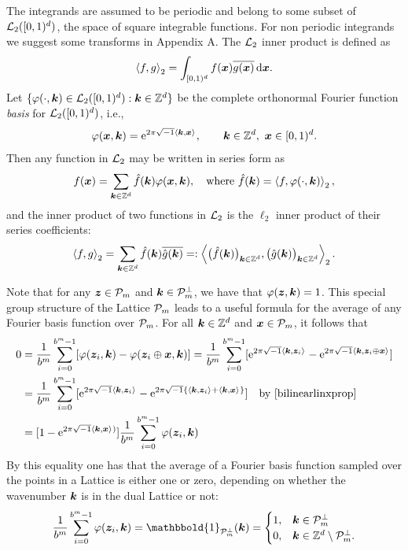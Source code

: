 \documentclass[graybox]{svmult}
\newcommand{\Z}{\mathbb{Z}} %
\newcommand{\bsx}{\boldsymbol{x}}    %
\newcommand{\bsz}{\boldsymbol{z}}    %
\newcommand{\ind}{\mathbbold{1}}
\begin{document}
The integrands are assumed to be periodic and belong to some subset of $\mathcal{L}_2([0,1)^d)$, the space of square integrable functions. For non periodic integrands we suggest some transforms in Appendix A. The $\mathcal{L}_2$ inner product is defined as
\[
\ip[2]{f}{g} = \int_{\cube} f(\bsx) \overline{g(\bsx)} \, \dif \bsx.
\]
Let $\{\varphi(\cdot,\bsk) \in \cl_2(\cube) : \bsk \in \Z^d\}$ be the complete orthonormal Fourier function \emph{basis} for $\mathcal{L}_2([0,1)^d)$, i.e.,
\[
\varphi(\bsx,\bsk)  = \E^{2 \pi \sqrt{-1} \ip{\bsk}{\bsx}}, \qquad \bsk \in \Z^d, \ \bsx \in \cube.
\]
Then any function in $\mathcal{L}_2$ may be written in series form as
\begin{equation} \label{Fourierdef}
f(\bsx) = \sum_{\bsk \in \Z^d} \hf(\bsk) \varphi(\bsx,\bsk), \quad \text{where } \hf(\bsk) = \ip[2]{f}{\varphi(\cdot,\bsk)},
\end{equation}
and the inner product of two functions in $\mathcal{L}_2$ is the $\ell_2$ inner product of their series coefficients:
\[
\ip[2]{f}{g} = \sum_{\bsk \in \Z^d} \hf(\bsk)\overline{\hg(\bsk)} =: \ip[2]{\bigl(\hf(\bsk)\bigr)_{\bsk \in \Z^d}}{\bigl ( \hg(\bsk)\bigr )_{\bsk \in \Z^d}}.
\]

Note that for any $\bsz\in\cp_m$ and $\boldsymbol{k}\in\mathcal{P}_m^\perp$, we have that $\varphi(\bsz,\bsk)=1$. This special group structure of the Lattice $\mathcal{P}_m$ leads to a useful formula for the average of any Fourier basis function over $\mathcal{P}_m$. For all $\bsk \in \Z^d$ and $\bsx \in \cp_m$, it follows that
\begin{align*}
\nonumber
0 & = \frac{1}{b^m} \sum_{i=0}^{b^m-1} [\varphi(\bsz_i,\bsk) - \varphi(\bsz_i \oplus \bsx,\bsk)]
= \frac{1}{b^m} \sum_{i=0}^{b^m-1} [\E^{2 \pi \sqrt{-1} \ip{\bsk}{\bsz_i}} - \E^{2 \pi \sqrt{-1} \ip{\bsk}{\bsz_i \oplus \bsx}}]\\
\nonumber
& = \frac{1}{b^m} \sum_{i=0}^{b^m-1} [\E^{2 \pi \sqrt{-1} \ip{\bsk}{\bsz_i}} - \E^{2 \pi \sqrt{-1} \{\ip{\bsk}{\bsz_i}+\ip{\bsk}{\bsx}\}}] \quad \text{by } \eqref{bilinearlinxprop}\\
\label{sumeq}
& = [1 - \E^{2 \pi \sqrt{-1} \ip{\bsk}{\bsx})}] \frac{1}{b^m} \sum_{i=0}^{b^m-1} \varphi(\bsz_i,\bsk)
\end{align*}
By this equality one has that the average of a Fourier basis function sampled over the points in a Lattice is either one or zero, depending on whether the wavenumber $\boldsymbol{k}$ is in the dual Lattice or not:
\begin{equation}\label{avrFourier}
\frac{1}{b^m} \sum_{i=0}^{b^m-1} \varphi(\bsz_i,\bsk) = \ind_{\cp_m^{\perp}}(\bsk) = \begin{cases} 1 , & \bsk \in \cp_m^{\perp}\\
 0,  & \bsk \in \Z^d \setminus \cp_m^{\perp}.
 \end{cases}
\end{equation}
\end{document}
